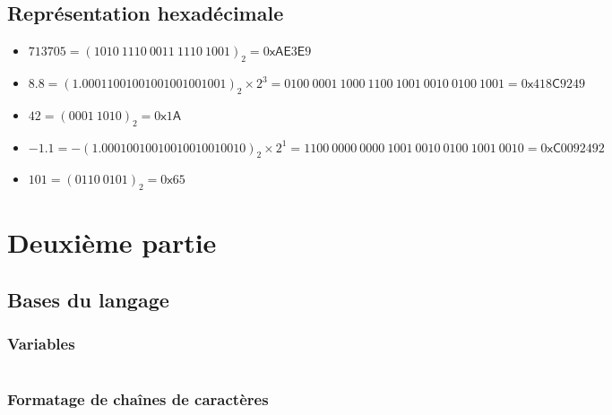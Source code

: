 \documentclass[../main.tex]{subfiles}
\begin{document}
\subsection{Représentation hexadécimale}
\begin{itemize}
	\item $713705 = (1010\ 1110\ 0011\ 1110\ 1001)_{2} = 0\textsf{xAE}3\textsf{E}9$
	\item $8.8 = (1.00011001001001001001001)_{2}\times 2^{3} = 0100\ 0001\ 1000\ 1100\ 1001\ 0010\ 0100\ 1001 = 0\textsf{x}418\textsf{C}9249$
	\item $42 = (0001\ 1010)_{2} = 0\textsf{x}1\textsf{A}$
	\item $-1.1 = -(1.00010010010010010010010)_2\times{2^1} = 1100\ 0000\ 0000\ 1001\ 0010\ 0100\ 1001\ 0010 = 0\textsf{xC}0092492$
	\item $101 = (0110\ 0101)_2 = 0\textsf{x}65$
\end{itemize}
\section{Deuxième partie}
\subsection{Bases du langage}
\subsubsection{Variables}
\inputminted{c}{solutions/inter_var_side_effect.c}
\subsubsection{Formatage de chaînes de caractères}
\inputminted{c}{solutions/taille_types.c}
\end{document}
